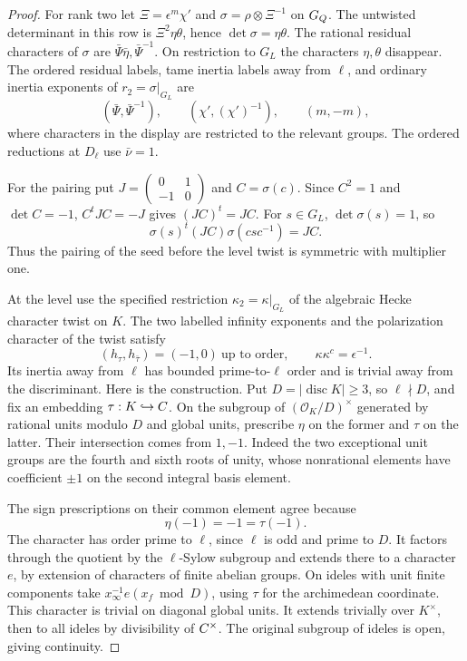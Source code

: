 \begin{proof}
For rank two let \(\Xi=\epsilon^m\chi'\) and
\(\sigma=\rho\otimes\Xi^{-1}\) on \(G_Q\).
The untwisted determinant in this row is \(\Xi^2\eta\theta\),
hence \(\det\sigma=\eta\theta\). The rational residual
characters of \(\sigma\) are \(\bar\Psi\bar\eta,\bar\Psi^{-1}\).
On restriction to \(G_L\) the characters \(\eta,\theta\) disappear.
The ordered residual labels, tame inertia labels away from \(\ell\),
and ordinary inertia exponents of \(r_2=\sigma|_{G_L}\) are
\[
  (\bar\Psi,\bar\Psi^{-1}),\qquad
  (\chi',(\chi')^{-1}),\qquad (m,-m),
\]
where characters in the display are restricted to the relevant
groups. The ordered reductions at \(D_\ell\) use \(\bar\nu=1\).

For the pairing put \(J=\left(\begin{smallmatrix}0&1\\-1&0\end{smallmatrix}\right)\)
and \(C=\sigma(c)\). Since \(C^2=1\) and \(\det C=-1\),
\(C^tJC=-J\) gives \((JC)^t=JC\). For \(s\in G_L\),
\(\det\sigma(s)=1\), so
\[
             \sigma(s)^t(JC)\sigma(csc^{-1})=JC .
\]
Thus the pairing of the seed before the level twist is symmetric
with multiplier one.


At the level use the specified restriction \(\kappa_2=\kappa|_{G_L}\)
of the algebraic Hecke character twist on \(K\). The two labelled infinity exponents and the polarization character of the twist satisfy
\[
 (h_\tau,h_{\bar\tau})=(-1,0)\ \text{up to order},\qquad\kappa\kappa^c=\epsilon^{-1}.
\]
Its inertia away from \(\ell\) has bounded prime-to-\(\ell\) order and is trivial away from the discriminant. Here is the construction. Put
\(D=|\operatorname{disc}K|\ge3\), so \(\ell\nmid D\), and fix an
embedding \(\tau:K\hookrightarrow C\). On the subgroup of
\((\mathcal O_K/D)^\times\) generated by rational units modulo
\(D\) and global units, prescribe \(\eta\) on the former and
\(\tau\) on the latter. Their intersection comes from \(1,-1\).
Indeed the two exceptional unit groups are the fourth and sixth
roots of unity, whose nonrational elements have coefficient
\(\pm1\) on the second integral basis element.

The sign prescriptions on their common element agree because
\[
 \eta(-1)=-1=\tau(-1).
\] The character has order
prime to \(\ell\), since \(\ell\) is odd and prime to \(D\).
It factors through the quotient by the \(\ell\)-Sylow subgroup
and extends there to a character \(e\), by extension of characters
of finite abelian groups. On ideles with unit finite components take
\(x_\infty^{-1} e(x_f\bmod D)\), using \(\tau\) for the archimedean
coordinate. This character is trivial on diagonal global units.
It extends trivially over \(K^\times\), then to all ideles by
divisibility of \(C^\times\). The original subgroup of ideles
is open, giving continuity.


\end{proof}
